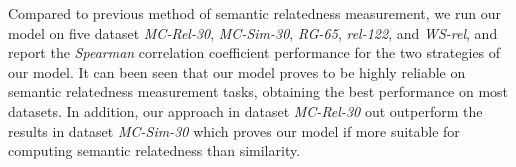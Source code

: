 Compared to previous method of semantic relatedness measurement, we run our model on five dataset
\emph{MC-Rel-30}, \emph{MC-Sim-30}, \emph{RG-65}, \emph{rel-122}, and \emph{WS-rel}, and report the
\emph{Spearman} correlation coefficient performance for the two strategies of our model. It can been
seen that our model proves to be highly reliable on semantic relatedness measurement tasks, obtaining
the best performance on most datasets. In addition, our approach in dataset \emph{MC-Rel-30} out outperform
the results in dataset \emph{MC-Sim-30} which proves our model if more suitable for computing semantic
relatedness than similarity. 